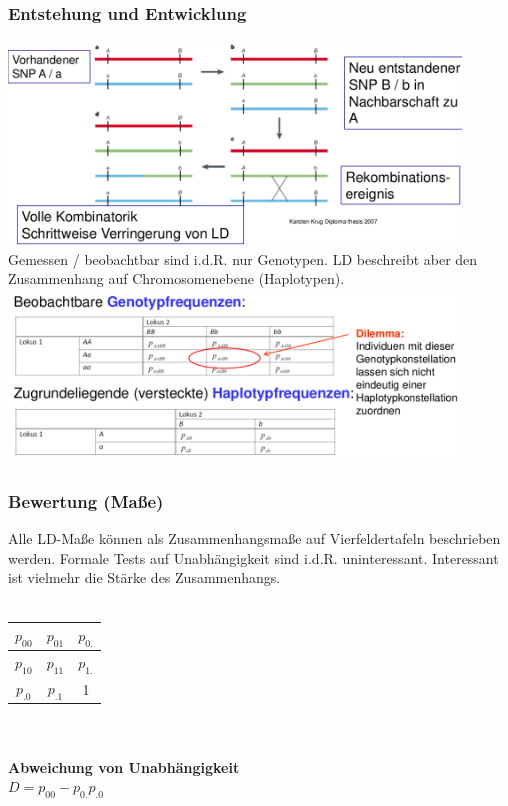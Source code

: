 \subsubsection{Entstehung und Entwicklung}
\includegraphics[width=0.9\textwidth]{lectures/V8/pix/LD_genesis.png}
\\
Gemessen / beobachtbar sind i.d.R. nur Genotypen. LD beschreibt aber den Zusammenhang auf Chromosomenebene (Haplotypen).\\
\includegraphics[width=0.9\textwidth]{lectures/V8/pix/gtf_vs_htf.png}

\subsubsection{Bewertung (Maße)}
Alle LD-Maße können als Zusammenhangsmaße auf Vierfeldertafeln beschrieben werden. Formale Tests auf Unabhängigkeit sind i.d.R. uninteressant. Interessant ist vielmehr die Stärke des Zusammenhangs.\\\\
\begin{tabular}{|c|c|c|}
\hline
	$p_{00}$ & $p_{01}$ & $p_{0.}$\\
\hline
	$p_{10}$ & $p_{11}$ & $p_{1.}$\\
\hline
	$p_{.0}$ & $p_{.1}$ & 1\\
\hline
\end{tabular}
\\\\
\textbf{Abweichung von Unabhängigkeit}\\
$D=p_{00} - p_{0.}p_{.0}$

